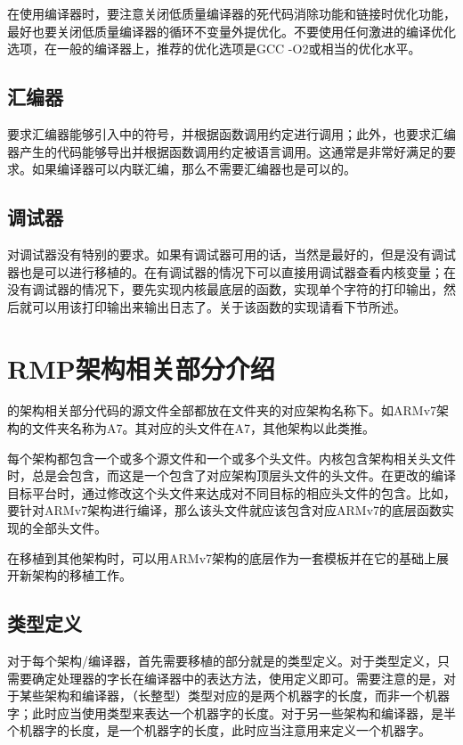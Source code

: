 在使用编译器时，要注意关闭低质量编译器的死代码消除功能和链接时优化功能，最好也要关闭低质量编译器的循环不变量外提优化。不要使用任何激进的编译优化选项，在一般的编译器上，推荐的优化选项是GCC -O2或相当的优化水平。

\subsection{汇编器}\label{subsec:assembler}

要求汇编器能够引入中的符号，并根据函数调用约定进行调用；此外，也要求汇编器产生的代码能够导出并根据函数调用约定被语言调用。这通常是非常好满足的要求。如果编译器可以内联汇编，那么不需要汇编器也是可以的。

\subsection{调试器}\label{subsec:debugger}

对调试器没有特别的要求。如果有调试器可用的话，当然是最好的，但是没有调试器也是可以进行移植的。在有调试器的情况下可以直接用调试器查看内核变量；在没有调试器的情况下，要先实现内核最底层的函数，实现单个字符的打印输出，然后就可以用该打印输出来输出日志了。关于该函数的实现请看下节所述。

\section{RMP架构相关部分介绍}\label{sec:architecture-dependent-parts-of-rmp}

的架构相关部分代码的源文件全部都放在文件夹的对应架构名称下。如ARMv7架构的文件夹名称为A7。其对应的头文件在A7，其他架构以此类推。

每个架构都包含一个或多个源文件和一个或多个头文件。内核包含架构相关头文件时，总是会包含，而这是一个包含了对应架构顶层头文件的头文件。在更改的编译目标平台时，通过修改这个头文件来达成对不同目标的相应头文件的包含。比如，要针对ARMv7架构进行编译，那么该头文件就应该包含对应ARMv7的底层函数实现的全部头文件。

在移植到其他架构时，可以用ARMv7架构的底层作为一套模板并在它的基础上展开新架构的移植工作。

\subsection{类型定义}\label{subsec:type-definitions}

对于每个架构/编译器，首先需要移植的部分就是的类型定义。对于类型定义，只需要确定处理器的字长在编译器中的表达方法，使用定义即可。需要注意的是，对于某些架构和编译器，（长整型）类型对应的是两个机器字的长度，而非一个机器字；此时应当使用类型来表达一个机器字的长度。对于另一些架构和编译器，是半个机器字的长度，是一个机器字的长度，此时应当注意用来定义一个机器字。

